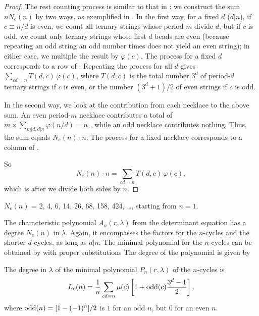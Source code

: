 \documentclass[twocolumn]{revtex4-1}
\begin{document}
\begin{proof}
The rest counting process is similar to that in :
%
we construct the sum $n N_e(n)$ by two ways, as exemplified in .
%
In the first way,
  for a fixed $d$ ($d|n$),
  if $c\equiv n/d$ is even,
    we count all ternary strings whose period $m$ divide $d$,
  but if $c$ is odd, we count only ternary strings
    whose first $d$ beads are even
    (because repeating an odd string an odd number times
    does not yield an even string);
  in either case, we multiple the result by $\varphi(c)$.
%
The process for a fixed $d$ corresponds to a row of .
%
Repeating the process for all $d$ gives
  $\sum_{cd = n} T(d, c) \, \varphi(c)$,
  where $T(d, c)$ is the total number $3^d$ of period-$d$ ternary strings if $c$ is even,
  or the number $(3^d+1)/2$ of even strings if $c$ is odd.


In the second way,
  we look at the contribution from each necklace to the above sum.
An even period-$m$ necklace contributes a total of
  $m \times \sum_{m|d, d|n} \varphi(n/d) = n$
  ,
  while an odd necklace contributes nothing.
Thus, the sum equals $N_e(n)\cdot n$.
%
The process for a fixed necklace corresponds to
  a column of .


So
\[
  N_e(n) \cdot n = \sum_{cd = n} T(d, c) \, \varphi(c),
\]
which is 
after we divide both sides by $n$.
\end{proof}

%
$N_e(n)$ = 2, 4, 6, 14, 26, 68, 158, 424, \dots, starting from $n = 1$.
%



The characteristic polynomial $A_n(r, \lambda)$
  from the determinant equation
  has a degree $N_e(n)$ in $\lambda$.
Again, it encompasses the factors for the $n$-cycles
  and the shorter $d$-cycles, as long as $d|n$.
The minimal polynomial for the $n$-cycles can be obtained
  by  with proper substitutions
The degree of the polynomial is given by


\begin{theorem}
The degree in $\lambda$ of
the minimal polynomial $P_n(r, \lambda)$ of the $n$-cycles is
\begin{equation}
  L_e(n) = \frac{1}{n} \sum_{cd = n} \mu(c)
    \left[
      1 + \mathrm{odd}(c)\frac{3^d-1}{2}
    \right],
\label{eq:cublyndon}
\end{equation}
where $\mathrm{odd}(n) = [1 - (-1)^n]/2$
is $1$ for an odd $n$,
but $0$ for an even $n$.
\label{thm:cublyndon}
\end{theorem}
\end{document}
